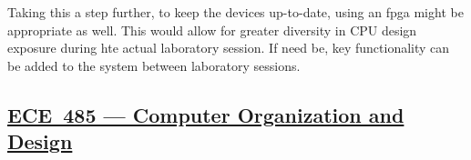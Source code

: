 Taking this a step further, to keep the devices up-to-date, using an \Gls{fpga} might be appropriate as well.
This would allow for greater diversity in CPU design exposure during hte actual laboratory session.
If need be, key functionality can be added to the system between laboratory sessions.

\subsection{\href{http://bulletin.iit.edu/search/?P=ECE 485}{ECE~485 --- Computer Organization and Design}}\label{sec:ECE_485}

